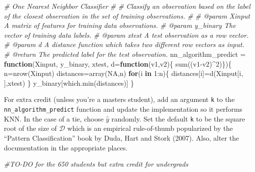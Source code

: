 \documentclass[
]{article}
\newenvironment{Shaded}{\begin{snugshade}}{\end{snugshade}}
\newcommand{\AttributeTok}[1]{\textcolor[rgb]{0.77,0.63,0.00}{#1}}
\newcommand{\CommentTok}[1]{\textcolor[rgb]{0.56,0.35,0.01}{\textit{#1}}}
\newcommand{\ConstantTok}[1]{\textcolor[rgb]{0.00,0.00,0.00}{#1}}
\newcommand{\ControlFlowTok}[1]{\textcolor[rgb]{0.13,0.29,0.53}{\textbf{#1}}}
\newcommand{\DecValTok}[1]{\textcolor[rgb]{0.00,0.00,0.81}{#1}}
\newcommand{\FunctionTok}[1]{\textcolor[rgb]{0.00,0.00,0.00}{#1}}
\newcommand{\NormalTok}[1]{#1}
\newcommand{\OtherTok}[1]{\textcolor[rgb]{0.56,0.35,0.01}{#1}}
\newcommand{\SpecialCharTok}[1]{\textcolor[rgb]{0.00,0.00,0.00}{#1}}
\begin{document}
\begin{Shaded}
\begin{Highlighting}[]
\CommentTok{\#\textquotesingle{} One Nearest Neighbor Classifier}
\CommentTok{\#\textquotesingle{}}
\CommentTok{\#\textquotesingle{} Classify an observation based on the label of the closest observation in the set of training observations.}
\CommentTok{\#\textquotesingle{}}
\CommentTok{\#\textquotesingle{} @param Xinput      A matrix of features for training data observations.}
\CommentTok{\#\textquotesingle{} @param y\_binary    The vector of training data labels.}
\CommentTok{\#\textquotesingle{} @param xtest       A test observation as a row vector.}
\CommentTok{\#\textquotesingle{} @param d           A distance function which takes two different row vectors as input.}
\CommentTok{\#\textquotesingle{} @return            The predicted label for the test observation.}
\NormalTok{nn\_algorithm\_predict }\OtherTok{=} \ControlFlowTok{function}\NormalTok{(Xinput, y\_binary, xtest, }\AttributeTok{d=}\ControlFlowTok{function}\NormalTok{(v1,v2)\{}
  \FunctionTok{sum}\NormalTok{((v1}\SpecialCharTok{{-}}\NormalTok{v2)}\SpecialCharTok{\^{}}\DecValTok{2}\NormalTok{)\})\{}
\NormalTok{  n}\OtherTok{=}\FunctionTok{nrow}\NormalTok{(Xinput)}
\NormalTok{  distances}\OtherTok{=}\FunctionTok{array}\NormalTok{(}\ConstantTok{NA}\NormalTok{,n)}
  \ControlFlowTok{for}\NormalTok{(i }\ControlFlowTok{in} \DecValTok{1}\SpecialCharTok{:}\NormalTok{n)\{}
\NormalTok{    distances[i]}\OtherTok{=}\FunctionTok{d}\NormalTok{(Xinput[i, ],xtest)}
\NormalTok{  \}}
\NormalTok{  y\_binary[}\FunctionTok{which.min}\NormalTok{(distances)]}
\NormalTok{\}}
\end{Highlighting}
\end{Shaded}

For extra credit (unless you're a masters student), add an argument
\texttt{k} to the \texttt{nn\_algorithm\_predict} function and update
the implementation so it performs KNN. In the case of a tie, choose
\(\hat{y}\) randomly. Set the default \texttt{k} to be the square root
of the size of \(\mathcal{D}\) which is an empirical rule-of-thumb
popularized by the ``Pattern Classification'' book by Duda, Hart and
Stork (2007). Also, alter the documentation in the appropriate places.

\begin{Shaded}
\begin{Highlighting}[]
\CommentTok{\#TO{-}DO for the 650 students but extra credit for undergrads}
\end{Highlighting}
\end{Shaded}
\end{document}
